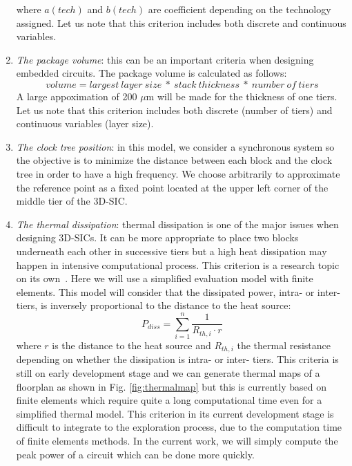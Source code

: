 \begin{enumerate}
\begin{equation}
\end{equation}
where $a(tech)$ and $b(tech)$ are coefficient depending on the technology assigned.
Let us note that this criterion includes both discrete and continuous variables.
\item \textit{The package volume}: this can be an important criteria when designing embedded circuits. The package volume is calculated as follows:
\begin{equation}
volume=largest~layer~size~*~stack~thickness~*~number~of~tiers
\label{eqn:volume}
\end{equation}
A large appoximation of 200 $\mu$m will be made for the thickness of one tiers.
Let us note that this criterion includes both discrete (number of tiers) and continuous variables (layer size).
\item \textit{The clock tree position}: in this model, we consider a synchronous system so the objective is to minimize the distance between each block and the clock tree in order to have a high frequency. We choose arbitrarily to approximate the reference point as a fixed point located at the upper left corner of the middle tier of the 3D-SIC.
\item \textit{The thermal dissipation}: thermal dissipation is one of the major issues when designing 3D-SICs. It can be more appropriate to place two blocks underneath each other in successive tiers but a high heat dissipation may happen in intensive computational process. This criterion is a research topic on its own~\cite{1112292, 1486402}. Here we will use a simplified evaluation model with finite elements. This model will consider that the dissipated power, intra- or inter- tiers, is inversely proportional to the distance to the heat source:
\begin{equation}
P_{diss} = \sum_{i=1}^{n} \frac{1}{R_{th, i} \cdot r}
\label{eqn:pdiss}
\end{equation}
where $r$ is the distance to the heat source and $R_{th, i}$ the thermal resistance depending on whether the dissipation is intra- or inter- tiers.
This criteria is still on early development stage and we can generate thermal maps of a floorplan as shown in Fig. \ref{fig:thermalmap} but this is currently based on finite elements \cite{4263187} which require quite a long computational time even for a simplified thermal model.
This criterion in its current development stage is difficult to integrate to the exploration process, due to the computation time of finite elements methods. In the current work, we will simply compute the peak power of a circuit which can be done more quickly.


\end{enumerate}

